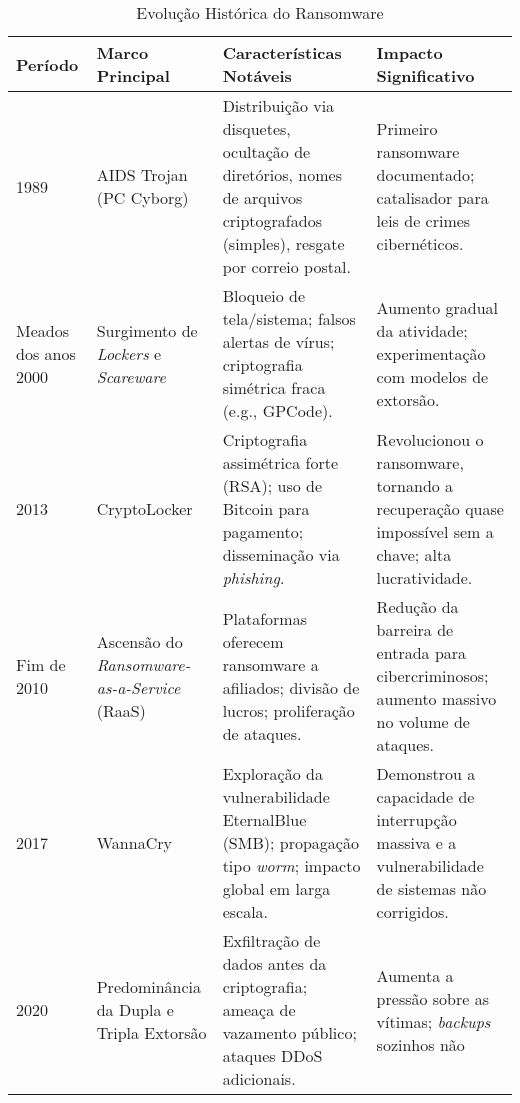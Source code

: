 
\begin{table}[htbp]
    \centering
    \small
    \caption{Evolução Histórica do Ransomware}
    \label{tab:evolucao_historica}
    \begin{tabularx}{\textwidth}{|l|p{3cm}|p{5cm}|p{5cm}|}
        \hline
        \textbf{Período} & \textbf{Marco Principal} & \textbf{Características Notáveis} & \textbf{Impacto Significativo} \\ \hline
        1989 & AIDS Trojan (PC Cyborg) & Distribuição via disquetes, ocultação de diretórios, nomes de arquivos criptografados 
        (simples), resgate por correio postal. & Primeiro ransomware documentado; catalisador para leis de crimes cibernéticos. 
        \cite{CyberMaxxRansomwareHistory, Muniandy2024Ransomware, WatchGuardAIDSTrojan} \\ \hline
        Meados dos anos 2000 & Surgimento de \textit{Lockers} e \textit{Scareware} & Bloqueio de tela/sistema; falsos alertas de vírus; 
        criptografia simétrica fraca (e.g., GPCode). & Aumento gradual da atividade; experimentação com modelos de extorsão. 
        \cite{Tanni2022RedAlert, MasterDCRansomwareHowItWorks, Robb2024RansomwareHistory} \\ \hline
        2013 & CryptoLocker & Criptografia assimétrica forte (RSA); uso de Bitcoin para pagamento; disseminação via 
        \textit{phishing}. & Revolucionou o ransomware, tornando a recuperação quase impossível sem a chave; alta lucratividade. 
        \cite{CyberMaxxRansomwareHistory, Muniandy2024Ransomware, Robb2024RansomwareHistory} \\ \hline
        Fim de 2010 & Ascensão do \textit{Ransomware-as-a-Service} (RaaS) & Plataformas oferecem ransomware a afiliados; 
        divisão de lucros; proliferação de ataques. & Redução da barreira de entrada para cibercriminosos; aumento massivo no 
        volume de ataques. \cite{CyberMaxxRansomwareHistory, Robb2024RansomwareHistory} \\ \hline
        2017 & WannaCry & Exploração da vulnerabilidade EternalBlue (SMB); propagação tipo \textit{worm}; impacto global em 
        larga escala. & Demonstrou a capacidade de interrupção massiva e a vulnerabilidade de sistemas não corrigidos. 
        \cite{CyberMaxxRansomwareHistory, WikipediaWannaCry} \\ \hline
        2020 & Predominância da Dupla e Tripla Extorsão & Exfiltração de dados antes da criptografia; ameaça 
        de vazamento público; ataques DDoS adicionais. & Aumenta a pressão sobre as vítimas; \textit{backups} sozinhos não 

\end{tabularx}
\end{table}
